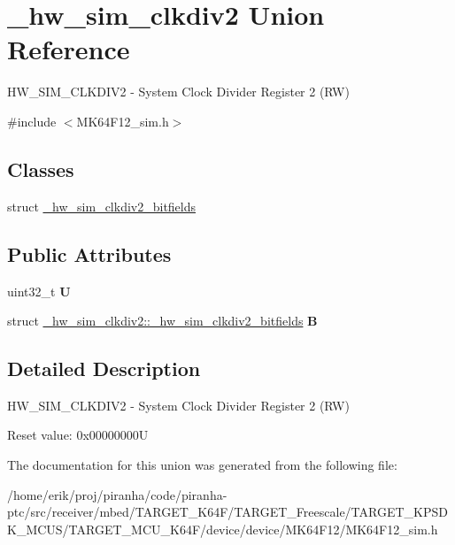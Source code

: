 \hypertarget{union__hw__sim__clkdiv2}{}\section{\+\_\+hw\+\_\+sim\+\_\+clkdiv2 Union Reference}
\label{union__hw__sim__clkdiv2}


H\+W\+\_\+\+S\+I\+M\+\_\+\+C\+L\+K\+D\+I\+V2 -\/ System Clock Divider Register 2 (RW)  




{\ttfamily \#include $<$M\+K64\+F12\+\_\+sim.\+h$>$}

\subsection*{Classes}
\begin{DoxyCompactItemize}
\item 
struct \hyperlink{struct__hw__sim__clkdiv2_1_1__hw__sim__clkdiv2__bitfields}{\+\_\+hw\+\_\+sim\+\_\+clkdiv2\+\_\+bitfields}
\end{DoxyCompactItemize}
\subsection*{Public Attributes}
\begin{DoxyCompactItemize}
\item 
uint32\+\_\+t {\bfseries U}\hypertarget{union__hw__sim__clkdiv2_ab6e837f80e9ade91d1017427871bf2d3}{}\label{union__hw__sim__clkdiv2_ab6e837f80e9ade91d1017427871bf2d3}

\item 
struct \hyperlink{struct__hw__sim__clkdiv2_1_1__hw__sim__clkdiv2__bitfields}{\+\_\+hw\+\_\+sim\+\_\+clkdiv2\+::\+\_\+hw\+\_\+sim\+\_\+clkdiv2\+\_\+bitfields} {\bfseries B}\hypertarget{union__hw__sim__clkdiv2_a7f4a77134b526410f12246ce3851929c}{}\label{union__hw__sim__clkdiv2_a7f4a77134b526410f12246ce3851929c}

\end{DoxyCompactItemize}


\subsection{Detailed Description}
H\+W\+\_\+\+S\+I\+M\+\_\+\+C\+L\+K\+D\+I\+V2 -\/ System Clock Divider Register 2 (RW) 

Reset value\+: 0x00000000U 

The documentation for this union was generated from the following file\+:\begin{DoxyCompactItemize}
\item 
/home/erik/proj/piranha/code/piranha-\/ptc/src/receiver/mbed/\+T\+A\+R\+G\+E\+T\+\_\+\+K64\+F/\+T\+A\+R\+G\+E\+T\+\_\+\+Freescale/\+T\+A\+R\+G\+E\+T\+\_\+\+K\+P\+S\+D\+K\+\_\+\+M\+C\+U\+S/\+T\+A\+R\+G\+E\+T\+\_\+\+M\+C\+U\+\_\+\+K64\+F/device/device/\+M\+K64\+F12/M\+K64\+F12\+\_\+sim.\+h\end{DoxyCompactItemize}
